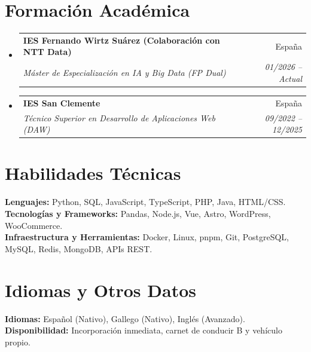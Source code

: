 \documentclass[a4paper,11pt]{article}
\makeatletter
\newcommand{\resumeSubheading}[4]{
  \vspace{4pt}\item
    \begin{tabular*}{0.97\textwidth}[t]{l@{\extracolsep{\fill}}r}
      \textbf{#1} & #2 \\
      \textit{\small#3} & \textit{\small #4} \\
    \end{tabular*}\vspace{-7pt}
}
\newcommand{\resumeSubHeadingListStart}{\begin{itemize}[leftmargin=0.15in, label={}, itemsep=10pt, parsep=4pt]}
\newcommand{\resumeSubHeadingListEnd}{\end{itemize}}
\makeatother
\begin{document}
\section{Formación Académica}
  \resumeSubHeadingListStart
   \resumeSubheading
      {IES Fernando Wirtz Suárez (Colaboración con NTT Data)}{España}
      {Máster de Especialización en IA y Big Data (FP Dual)}{01/2026 -- Actual}
   \resumeSubheading
      {IES San Clemente}{España}
      {Técnico Superior en Desarrollo de Aplicaciones Web (DAW)}{09/2022 -- 12/2025}
  \resumeSubHeadingListEnd

\section{Habilidades Técnicas}
 \begin{itemize}[leftmargin=0.15in, label={}, itemsep=6pt, topsep=4pt]
    \small{\item{
     \textbf{Lenguajes:} Python, SQL, JavaScript, TypeScript, PHP, Java, HTML/CSS. \\ \vspace{2pt}
     \textbf{Tecnologías y Frameworks:} Pandas, Node.js, Vue, Astro, WordPress, WooCommerce. \\ \vspace{2pt}
     \textbf{Infraestructura y Herramientas:} Docker, Linux, pnpm, Git, PostgreSQL, MySQL, Redis, MongoDB, APIs REST.
    }}
 \end{itemize}

\section{Idiomas y Otros Datos}
 \begin{itemize}[leftmargin=0.15in, label={}, itemsep=6pt, topsep=4pt]
    \small{\item{
     \textbf{Idiomas:} Español (Nativo), Gallego (Nativo), Inglés (Avanzado). \\ \vspace{2pt}
     \textbf{Disponibilidad:} Incorporación inmediata, carnet de conducir B y vehículo propio.
    }}
 \end{itemize}
\end{document}
